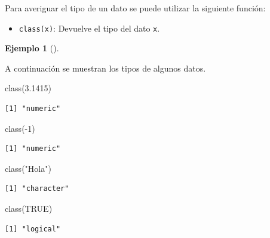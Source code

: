\documentclass[
  a4paper,
]{scrreport}
\newenvironment{Shaded}{\begin{snugshade}}{\end{snugshade}}
\newcommand{\ConstantTok}[1]{\textcolor[rgb]{0.56,0.35,0.01}{#1}}
\newcommand{\DecValTok}[1]{\textcolor[rgb]{0.68,0.00,0.00}{#1}}
\newcommand{\FloatTok}[1]{\textcolor[rgb]{0.68,0.00,0.00}{#1}}
\newcommand{\FunctionTok}[1]{\textcolor[rgb]{0.28,0.35,0.67}{#1}}
\newcommand{\NormalTok}[1]{\textcolor[rgb]{0.00,0.23,0.31}{#1}}
\newcommand{\SpecialCharTok}[1]{\textcolor[rgb]{0.37,0.37,0.37}{#1}}
\newcommand{\StringTok}[1]{\textcolor[rgb]{0.13,0.47,0.30}{#1}}
\providecommand{\tightlist}{%
  \setlength{\itemsep}{0pt}\setlength{\parskip}{0pt}}\usepackage{longtable,booktabs,array}
\theoremstyle{definition}
\theoremstyle{definition}
\newtheorem{example}{Ejemplo}[chapter]
\theoremstyle{remark}
\begin{document}
Para averiguar el tipo de un dato se puede utilizar la siguiente
función:

\begin{itemize}
\tightlist
\item
  \texttt{class(x)}: Devuelve el tipo del dato \texttt{x}.
\end{itemize}

\begin{example}[]\protect\hypertarget{exm-tipos-datos}{}\label{exm-tipos-datos}

A continuación se muestran los tipos de algunos datos.

\begin{Shaded}
\begin{Highlighting}[]
\FunctionTok{class}\NormalTok{(}\FloatTok{3.1415}\NormalTok{)}
\end{Highlighting}
\end{Shaded}

\begin{verbatim}
[1] "numeric"
\end{verbatim}

\begin{Shaded}
\begin{Highlighting}[]
\FunctionTok{class}\NormalTok{(}\SpecialCharTok{{-}}\DecValTok{1}\NormalTok{)}
\end{Highlighting}
\end{Shaded}

\begin{verbatim}
[1] "numeric"
\end{verbatim}

\begin{Shaded}
\begin{Highlighting}[]
\FunctionTok{class}\NormalTok{(}\StringTok{"Hola"}\NormalTok{)}
\end{Highlighting}
\end{Shaded}

\begin{verbatim}
[1] "character"
\end{verbatim}

\begin{Shaded}
\begin{Highlighting}[]
\FunctionTok{class}\NormalTok{(}\ConstantTok{TRUE}\NormalTok{)}
\end{Highlighting}
\end{Shaded}

\begin{verbatim}
[1] "logical"
\end{verbatim}


\end{example}
\end{document}

